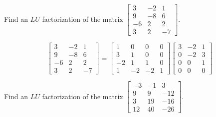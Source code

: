 \documentclass{ximera}
\begin{document}
\begin{problem}\label{prb:4.67} Find an $LU$ factorization of the matrix $\left[
\begin{array}{rrr}
3 & -2 & 1 \\
9 & -8 & 6 \\
-6 & 2 & 2 \\
3 & 2 & -7
\end{array}
\right] .$
\begin{hint}
\[
\left[
\begin{array}{rrr}
3 & -2 & 1 \\
9 & -8 & 6 \\
-6 & 2 & 2 \\
3 & 2 & -7
\end{array}
\right] = \left[
\begin{array}{rrrr}
1 & 0 & 0 & 0 \\
3 & 1 & 0 & 0 \\
-2 & 1 & 1 & 0 \\
1 & -2 & -2 & 1
\end{array}
\right]  \left[
\begin{array}{rrr}
3 & -2 & 1 \\
0 & -2 & 3 \\
0 & 0 & 1 \\
0 & 0 & 0
\end{array}
\right]
\]
\end{hint}
\end{problem}


\begin{problem}\label{prb:4.68} Find an $LU$ factorization of the matrix $\left[
\begin{array}{rrr}
-3 & -1 & 3 \\
9 & 9 & -12 \\
3 & 19 & -16 \\
12 & 40 & -26
\end{array}
\right] .$
\end{problem}
\end{document}
